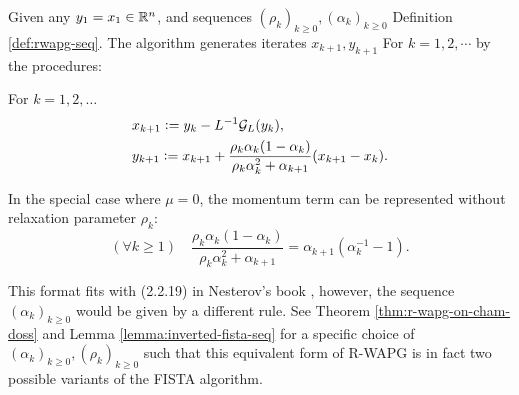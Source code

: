 \documentclass[12pt]{article}
\begin{document}
        \begin{definition}\label{def:r-wapg-momentum-form}
            Given any $y_1 = x_1 \in \mathbb R^n$, and sequences $(\rho_k)_{k \ge 0}, (\alpha_k)_{k\ge 0}$ Definition \ref{def:rwapg-seq}.
            The algorithm generates iterates $x_{k + 1}, y_{k + 1}$ For $k = 1, 2, \cdots $ by the procedures:
            \begin{tcolorbox}
                For $k=1, 2,\ldots $
                \begin{align*}
                    & x_{k + 1} \vcentcolon= y_k - L^{-1}\mathcal G_L (y_k),
                    \\
                    &
                    y_{k + 1} \vcentcolon=
                    x_{k + 1} +
                    \frac{\rho_k\alpha_k(1 - \alpha_k)}{\rho_k\alpha_k^2 + \alpha_{k + 1}}(x_{k + 1} - x_k).
                \end{align*}
            \end{tcolorbox}
            In the special case where $\mu = 0$, the momentum term can be represented without relaxation parameter $\rho_k$:
            $$
                (\forall k \ge 1)\quad \frac{\rho_k\alpha_k(1 - \alpha_k)}{\rho_k\alpha_k^2 + \alpha_{k + 1}}
                = \alpha_{k + 1}(\alpha_k^{-1} - 1).
            $$
        \end{definition}
        \begin{remark}
            This format fits with (2.2.19) in Nesterov's book \cite{nesterov_lectures_2018}, however, the sequence $(\alpha_k)_{k \ge 0}$ would be given by a different rule.
            See Theorem \ref{thm:r-wapg-on-cham-doss} and Lemma \ref{lemma:inverted-fista-seq} for a specific choice of $(\alpha_k)_{k \ge0}, (\rho_k)_{ k\ge 0}$ such that this equivalent form of R-WAPG is in fact two possible variants of the FISTA algorithm.
        \end{remark}
\end{document}
